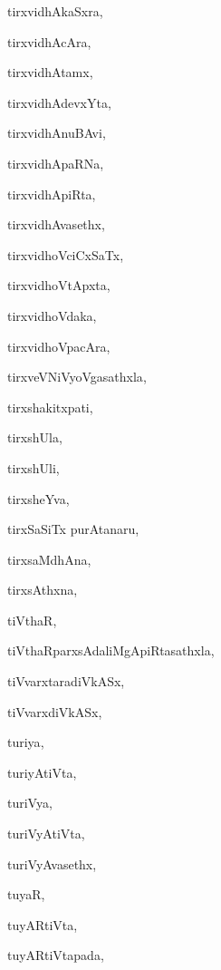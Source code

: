\begin{multicols}{2}
{tirxvidhAkaSxra}, \pageref{tirxvidhAkaSxra}

{tirxvidhAcAra}, \pageref{tirxvidhAcAra}

{tirxvidhAtamx}, \pageref{tirxvidhAtamx}

{tirxvidhAdevxYta}, \pageref{tirxvidhAdevxYta}

{tirxvidhAnuBAvi}, \pageref{tirxvidhAnuBAvi}

{tirxvidhApaRNa}, \pageref{tirxvidhApaRNa}

{tirxvidhApiRta}, \pageref{tirxvidhApiRta}

{tirxvidhAvasethx}, \pageref{tirxvidhAvasethx}

{tirxvidhoVciCxSaTx}, \pageref{tirxvidhoVciCxSaTx}

{tirxvidhoVtApxta}, \pageref{tirxvidhoVtApxta}

{tirxvidhoVdaka}, \pageref{tirxvidhoVdaka}

{tirxvidhoVpacAra}, \pageref{tirxvidhoVpacAra}

{tirxveVNiVyoVgasathxla}, \pageref{tirxveVNiVyoVgasathxla}

{tirxshakitxpati}, \pageref{tirxshakitxpati}

{tirxshUla}, \pageref{tirxshUla}

{tirxshUli}, \pageref{tirxshUli}

{tirxsheYva}, \pageref{tirxsheYva}

{tirxSaSiTx purAtanaru}, \pageref{tirxSaSiTx purAtanaru}

{tirxsaMdhAna}, \pageref{tirxsaMdhAna}

{tirxsAthxna}, \pageref{tirxsAthxna}

{tiVthaR}, \pageref{tiVthaR}

{tiVthaRparxsAdaliMgApiRtasathxla}, \pageref{tiVthaRparxsAdaliMgApiRtasathxla}

{tiVvarxtaradiVkASx}, \pageref{tiVvarxtaradiVkASx}

{tiVvarxdiVkASx}, \pageref{tiVvarxdiVkASx}

{turiya}, \pageref{turiya}

{turiyAtiVta}, \pageref{turiyAtiVta}

{turiVya}, \pageref{turiVya}

{turiVyAtiVta}, \pageref{turiVyAtiVta}

{turiVyAvasethx}, \pageref{turiVyAvasethx}

{tuyaR}, \pageref{tuyaR}

{tuyARtiVta}, \pageref{tuyARtiVta}

{tuyARtiVtapada}, \pageref{tuyARtiVtapada}


\end{multicols}
